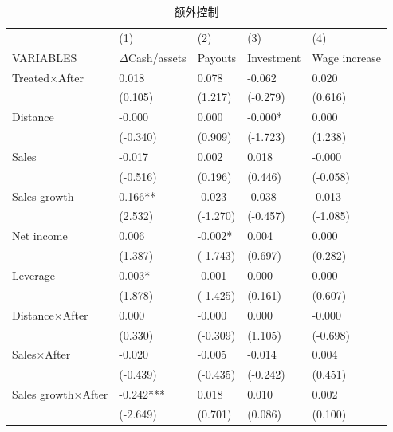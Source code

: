 \documentclass{article}
\begin{document}
\begin{table}[H]
    \centering
    \caption{额外控制}
    \begin{tabular}{@{}lllll@{}}
    \toprule
                       & (1)          & (2)      & (3)        & (4)           \\ \cmidrule(l){2-5} 
    VARIABLES          & $\Delta$Cash/assets & Payouts  & Investment & Wage increase \\ \midrule
    Treated×After      & 0.018        & 0.078    & -0.062     & 0.020         \\
                       & (0.105)      & (1.217)  & (-0.279)   & (0.616)       \\
    Distance           & -0.000       & 0.000    & -0.000*    & 0.000         \\
                       & (-0.340)     & (0.909)  & (-1.723)   & (1.238)       \\
    Sales              & -0.017       & 0.002    & 0.018      & -0.000        \\
                       & (-0.516)     & (0.196)  & (0.446)    & (-0.058)      \\
    Sales growth       & 0.166**      & -0.023   & -0.038     & -0.013        \\
                       & (2.532)      & (-1.270) & (-0.457)   & (-1.085)      \\
    Net income         & 0.006        & -0.002*  & 0.004      & 0.000         \\
                       & (1.387)      & (-1.743) & (0.697)    & (0.282)       \\
    Leverage           & 0.003*       & -0.001   & 0.000      & 0.000         \\
                       & (1.878)      & (-1.425) & (0.161)    & (0.607)       \\
    Distance×After     & 0.000        & -0.000   & 0.000      & -0.000        \\
                       & (0.330)      & (-0.309) & (1.105)    & (-0.698)      \\
    Sales×After        & -0.020       & -0.005   & -0.014     & 0.004         \\
                       & (-0.439)     & (-0.435) & (-0.242)   & (0.451)       \\
    Sales growth×After & -0.242***    & 0.018    & 0.010      & 0.002         \\
                       & (-2.649)     & (0.701)  & (0.086)    & (0.100)       \\

\end{tabular}
\end{table}
\end{document}
